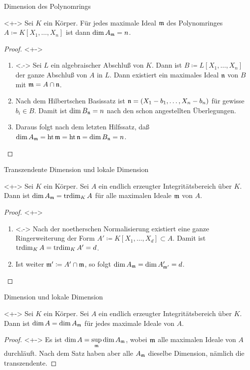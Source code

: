 \begin{frame}{Dimension des Polynomrings}
	\begin{lemma}<+->
		Sei \(K\) ein Körper. Für jedes maximale Ideal \(\mathfrak{m}\) des
		Polynomringes \(A \coloneqq K[X_1, \dotsc, X_n]\) ist dann
		\(\dim A_{\mathfrak{m}} = n\).
	\end{lemma}
	\begin{proof}<+->
		\begin{enumerate}[<+->]
		\item<.->
			Sei \(L\) ein algebraischer Abschluß von \(K\).
			Dann ist \(B \coloneqq L[X_1, \dotsc, X_n]\) der ganze
			Abschluß von \(A\) in \(L\). Dann existiert ein maximales
			Ideal \(\mathfrak{n}\) von \(B\) mit \(\mathfrak{m} = A \cap \mathfrak{n}\).
		\item		
			Nach dem Hilbertschen Basissatz ist
			\(\mathfrak{n} = (X_1 - b_1, \dotsc, X_n - b_n)\) für gewisse
			\(b_i \in B\). Damit ist \(\dim B_{\mathfrak{n}} = n\) nach den
			schon angestellten Überlegungen.
		\item
			Daraus folgt nach dem letzten Hilfssatz, daß \(\dim A_{\mathfrak{m}}
			= \operatorname{ht} \mathfrak{m} = \operatorname{ht} \mathfrak{n} = \dim B_{\mathfrak{n}} = n\).
			\qedhere
		\end{enumerate}
	\end{proof}
\end{frame}

\begin{frame}{Transzendente Dimension und lokale Dimension}
	\begin{theorem}<+->
		Sei \(K\) ein Körper. Sei \(A\) ein endlich erzeugter
		Integritätsbereich über \(K\). Dann ist \(\dim A_{\mathfrak{m}} = \operatorname{trdim}_K A\) für
		alle maximalen Ideale \(\mathfrak{m}\) von \(A\).
	\end{theorem}
	\begin{proof}<+->
		\begin{enumerate}[<+->]
		\item<.->
			Nach der noetherschen Normalisierung existiert eine ganze
			Ringerweiterung der Form \(A' \coloneqq K[X_1, \dotsc, X_d] \subset A\).
			Damit ist \(\operatorname{trdim}_K A = \operatorname{trdim}_K A' = d\).
		\item
			Ist weiter \(\mathfrak{m}' \coloneqq A' \cap \mathfrak{m}\), so folgt
			\(\dim A_{\mathfrak{m}} = \dim A'_{\mathfrak{m}'} = d\).
			\qedhere
		\end{enumerate}
	\end{proof}
\end{frame}

\begin{frame}{Dimension und lokale Dimension}
	\begin{corollary}<+->
		Sei \(K\) ein Körper. Sei \(A\) ein endlich erzeugter Integritätsbereich
		über \(K\). Dann ist \(\dim A = \dim A_{\mathfrak{m}}\) für jedes maximale
		Ideale von \(A\).
	\end{corollary}
	\begin{proof}<+->
		Es ist \(\dim A = \sup\limits_{\mathfrak{m}} \dim A_{\mathfrak{m}}\), wobei
		\(\mathfrak{m}\) alle maximalen Ideale von \(A\) durchläuft. Nach dem
		Satz haben aber alle \(A_{\mathfrak{m}}\) dieselbe Dimension, nämlich die
		transzendente.
	\end{proof}
\end{frame}

